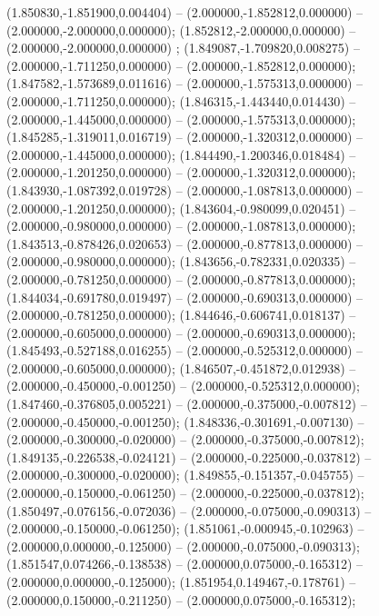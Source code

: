  (1.850830,-1.851900,0.004404) -- (2.000000,-1.852812,0.000000) -- (2.000000,-2.000000,0.000000);
 (1.852812,-2.000000,0.000000) -- (2.000000,-2.000000,0.000000) ;
 (1.849087,-1.709820,0.008275) -- (2.000000,-1.711250,0.000000) -- (2.000000,-1.852812,0.000000);
 (1.847582,-1.573689,0.011616) -- (2.000000,-1.575313,0.000000) -- (2.000000,-1.711250,0.000000);
 (1.846315,-1.443440,0.014430) -- (2.000000,-1.445000,0.000000) -- (2.000000,-1.575313,0.000000);
 (1.845285,-1.319011,0.016719) -- (2.000000,-1.320312,0.000000) -- (2.000000,-1.445000,0.000000);
 (1.844490,-1.200346,0.018484) -- (2.000000,-1.201250,0.000000) -- (2.000000,-1.320312,0.000000);
 (1.843930,-1.087392,0.019728) -- (2.000000,-1.087813,0.000000) -- (2.000000,-1.201250,0.000000);
 (1.843604,-0.980099,0.020451) -- (2.000000,-0.980000,0.000000) -- (2.000000,-1.087813,0.000000);
 (1.843513,-0.878426,0.020653) -- (2.000000,-0.877813,0.000000) -- (2.000000,-0.980000,0.000000);
 (1.843656,-0.782331,0.020335) -- (2.000000,-0.781250,0.000000) -- (2.000000,-0.877813,0.000000);
 (1.844034,-0.691780,0.019497) -- (2.000000,-0.690313,0.000000) -- (2.000000,-0.781250,0.000000);
 (1.844646,-0.606741,0.018137) -- (2.000000,-0.605000,0.000000) -- (2.000000,-0.690313,0.000000);
 (1.845493,-0.527188,0.016255) -- (2.000000,-0.525312,0.000000) -- (2.000000,-0.605000,0.000000);
 (1.846507,-0.451872,0.012938) -- (2.000000,-0.450000,-0.001250) -- (2.000000,-0.525312,0.000000);
 (1.847460,-0.376805,0.005221) -- (2.000000,-0.375000,-0.007812) -- (2.000000,-0.450000,-0.001250);
 (1.848336,-0.301691,-0.007130) -- (2.000000,-0.300000,-0.020000) -- (2.000000,-0.375000,-0.007812);
 (1.849135,-0.226538,-0.024121) -- (2.000000,-0.225000,-0.037812) -- (2.000000,-0.300000,-0.020000);
 (1.849855,-0.151357,-0.045755) -- (2.000000,-0.150000,-0.061250) -- (2.000000,-0.225000,-0.037812);
 (1.850497,-0.076156,-0.072036) -- (2.000000,-0.075000,-0.090313) -- (2.000000,-0.150000,-0.061250);
 (1.851061,-0.000945,-0.102963) -- (2.000000,0.000000,-0.125000) -- (2.000000,-0.075000,-0.090313);
 (1.851547,0.074266,-0.138538) -- (2.000000,0.075000,-0.165312) -- (2.000000,0.000000,-0.125000);
 (1.851954,0.149467,-0.178761) -- (2.000000,0.150000,-0.211250) -- (2.000000,0.075000,-0.165312);
